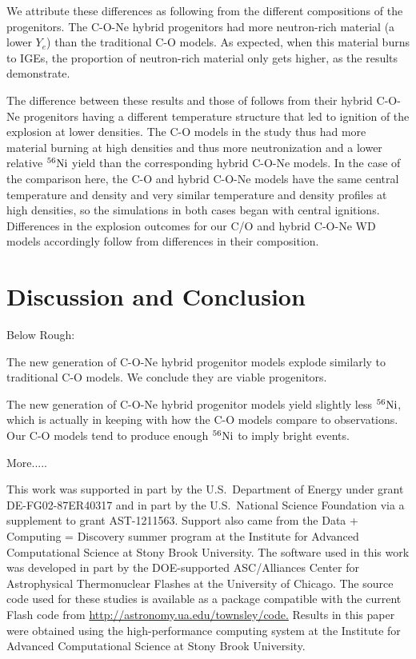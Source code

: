 \documentclass[iop,apj]{emulateapj}
\newcommand{\Ni}[1]{\ensuremath{{}^{#1}{\rm Ni}}}
\begin{document}
We attribute these differences as following from the different
compositions of the progenitors. The C-O-Ne hybrid progenitors
had more neutron-rich material (a lower $Y_e$) than the
traditional C-O models. As expected, when this material burns
to IGEs, the proportion of neutron-rich material only gets
higher, as the results demonstrate.

The difference between these results and those of
\citet{willcoxetal2016} follows from their hybrid C-O-Ne progenitors
having a different temperature structure that
led to ignition of the explosion at lower densities.
The C-O models in the \citet{willcoxetal2016} study
thus had more material burning at high densities and thus more
neutronization and a lower relative \Ni{56} yield than the
corresponding hybrid C-O-Ne models. In the case of the comparison here, the
C-O and hybrid C-O-Ne models {\color{red} have the same central
temperature and density and very similar temperature and density
profiles at high densities, so the simulations in both cases
began with central ignitions. Differences in the explosion outcomes
for our C/O and hybrid C-O-Ne WD models
accordingly follow from differences in their composition.}

\section{Discussion and Conclusion}

Below Rough:

The new generation of C-O-Ne hybrid progenitor models explode similarly to
traditional C-O models. We conclude they are viable progenitors.

The new generation of C-O-Ne hybrid progenitor models yield
slightly less \Ni{56}, which is actually in keeping with how
the C-O models compare to observations. Our C-O models tend
to produce enough \Ni{56} to imply bright events.

More.....

This work was supported in part by the U.S.\ Department of Energy under
grant DE-FG02-87ER40317 and in part by the U.S.\ National Science Foundation
via a supplement to grant AST-1211563.
Support also came from the Data + Computing = Discovery summer program at
the Institute for Advanced Computational Science at Stony Brook University.
The software used in this work was developed in part by the DOE-supported
ASC/Alliances Center for Astrophysical Thermonuclear Flashes at the
University of Chicago.
The source code used for
these studies is available as a package compatible with the
current Flash code from \url{http://astronomy.ua.edu/townsley/code.}
Results in this
paper were obtained using the high-performance computing system at the
Institute for Advanced Computational Science at Stony Brook
University.




\end{document}
